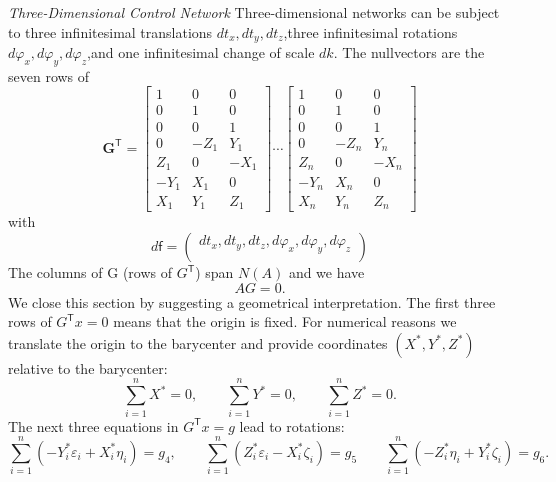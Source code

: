 \emph{Three-Dimensional Control Network} Three-dimensional networks can be subject to three infinitesimal translations $dt_x,dt_y,dt_z$,three infinitesimal rotations $d\varphi_x,d\varphi_y,d\varphi_z$,and one infinitesimal change of scale $dk$. The nullvectors are the seven rows of
\begin{equation}
	\mathbf{G}^\mathsf{T}
	=
	\begin{bmatrix}
		1 & 0 & 0 \\
		0 & 1 & 0 \\
		0 & 0 & 1 \\
		0 & -Z_1 & Y_1 \\
		Z_1 & 0 & -X_1 \\
		-Y_1 & X_1 & 0 \\
		X_1 & Y_1 & Z_1
	\end{bmatrix}
	\cdots
	\begin{bmatrix}
		1 & 0 & 0 \\
		0 & 1 & 0 \\
		0 & 0 & 1 \\
		0 & -Z_n & Y_n \\
		Z_n & 0 & -X_n\\
		-Y_n & X_n & 0 \\
		X_n & Y_n & Z_n
	\end{bmatrix}
\end{equation}
with
\begin{equation}
	d\mathsf{f}
	=
	\begin{pmatrix}
		dt_x,dt_y,dt_z,d\varphi_x,d\varphi_y,d\varphi_z \\
	\end{pmatrix}
\end{equation}
The columns of G (rows of $G^\mathsf{T}$) span $N(A)$ and we have
\begin{equation}
	AG = 0.
\end{equation}
We close this section by suggesting a geometrical interpretation. The first three rows of $G^\mathsf{T}x = 0$ means that the origin is fixed. For numerical reasons we translate the origin
to the barycenter and provide coordinates $(X^\ast,Y^\ast,Z^\ast)$relative to the barycenter:
\begin{equation*}
	\sum_{i=1}^{n}X^\ast = 0,\qquad\sum_{i=1}^{n}Y^\ast = 0,\qquad\sum_{i=1}^{n}Z^\ast = 0.
\end{equation*}
The next three equations in $G^\mathsf{T}x = g$ lead to rotations:
\begin{equation*}
	\sum_{i=1}^{n}(-Y_{i}^{\ast}\varepsilon_i + X_{i}^{\ast}\eta_i) = g_4,\qquad
	\sum_{i=1}^{n}( Z_{i}^{\ast}\varepsilon_i - X_{i}^{\ast}\zeta_i) = g_5\qquad
	\sum_{i=1}^{n}(-Z_{i}^{\ast}\eta_i        + Y_{i}^{\ast}\zeta_i) = g_6.
\end{equation*}
